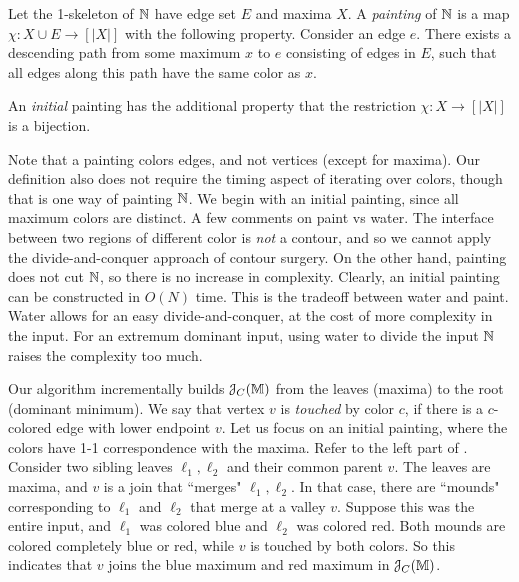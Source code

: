 {\begin{definition} \label{def:paint1}  Let the 1-skeleton of $\mathbb{N}$ have edge set $E$ and maxima $X$.
A  \emph{painting} of $\mathbb{N}$ is a map $\chi:X \cup E \to [|X|]$ with the following property. 
 Consider an edge $e$. There exists a descending path from some maximum $x$ to $e$
	consisting of edges in $E$, such that all edges along this path have the same color as $x$. 

An \emph{initial} painting has the additional property that the restriction $\chi:X \to [|X|]$ is a bijection.
\end{definition}

Note that a painting colors edges, and not vertices (except for maxima). Our definition also does not require the timing aspect
of iterating over colors, though that is one way of painting $\mathbb{N}$. We begin with an initial painting, since all maximum
colors are distinct. A few comments on paint vs water. The interface between two regions of different color
is \emph{not} a contour, and so we cannot apply the divide-and-conquer
approach of contour surgery. On the other hand, painting does not cut $\mathbb{N}$, so there is no increase in complexity.
Clearly, an initial painting can be constructed in $O(N)$ time. This is the tradeoff between water and paint.
Water allows for an easy divide-and-conquer, at the cost of more complexity in the input. For an extremum
dominant input, using water to divide the input $\mathbb{N}$ raises the complexity too much.

Our algorithm incrementally builds ${\cal J}_C(\mathbb{M})$ from the leaves (maxima) to the root (dominant minimum). 
We say that vertex $v$ is \emph{touched} by color $c$, if there is a $c$-colored edge with lower endpoint $v$.
Let us focus on an initial painting, where the colors have 1-1 correspondence with the maxima. Refer to the left part of .
Consider two sibling leaves $\ell_1, \ell_2$ and their common parent $v$. The leaves are maxima,
and $v$ is a join that ``merges" $\ell_1, \ell_2$. 
In that case, there are ``mounds" corresponding to $\ell_1$ and $\ell_2$ that merge
at a valley $v$. Suppose this was the entire input, and $\ell_1$ was colored blue and $\ell_2$ was colored red. 
Both mounds are colored completely blue or red, while $v$ is touched by both colors.
So this indicates that $v$ joins the blue maximum and red maximum in ${\cal J}_C(\mathbb{M})$.

}
